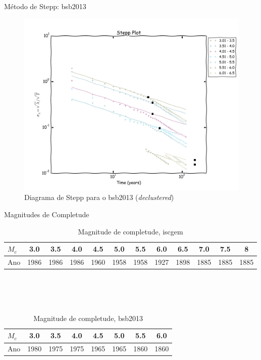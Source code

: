 \documentclass[ucs,8pt]{beamer}
\begin{document}
\begin{frame}{Método de Stepp: \gls{bsb2013}}
\begin{figure}[H]
	\centering
	\includegraphics[height=0.90\textheight]{stepp_br}
	\caption{Diagrama de Stepp para o \gls{bsb2013} (\emph{declustered})}
	\label{fig:br_stepp}
\end{figure}
\end{frame}



\begin{frame}[c]{Magnitudes de Completude}
	\begin{table}[h]
	  	\centering
	  	\footnotesize
		\begin{tabular}{l|*{11}{c}}
		$M_c$ & 3.0  & 3.5  & 4.0  & 4.5  & 5.0  & 5.5  & 6.0  & 6.5  & 7.0  & 7.5  & 8 \\  \hline
		Ano   & 1986 & 1986 & 1986 & 1960 & 1958 & 1958 & 1927 & 1898 & 1885 & 1885 & 1885   \\
		\end{tabular}
		\caption{Magnitude de completude, \gls{iscgem}}
		\label{tab:mc_sa}
	\end{table} \\
	\quad		\\
	\quad		\\
	\begin{table}[h]
	  	\centering
	  	\footnotesize
		\begin{tabular}{l|*{7}{c}}
		$M_c$ & 3.0  & 3.5  & 4.0  & 4.5  & 5.0  & 5.5  & 6.0  \\  \hline
		Ano   & 1980 & 1975 & 1975 & 1965 & 1965 & 1860 & 1860 \\
		\end{tabular}
		\caption{Magnitude de completude, \gls{bsb2013}}
		\label{tab:mc_br}
	\end{table}
\end{frame}
\end{document}
